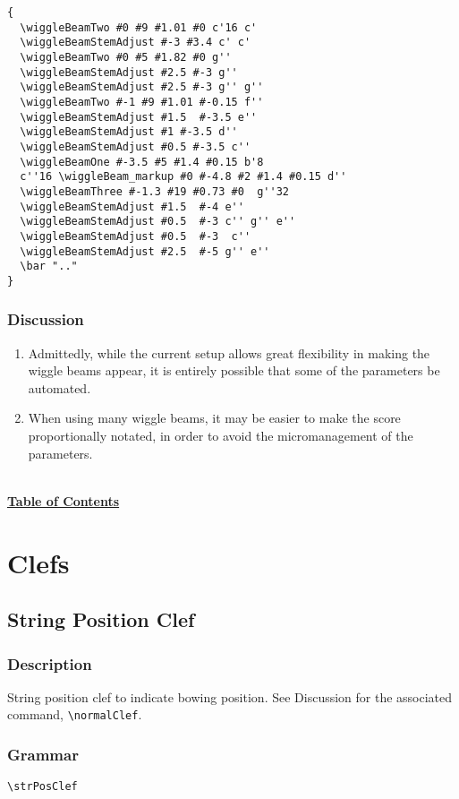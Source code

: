 \documentclass[11pt, oneside]{book}   	%
\begin{document}
\begin{verbatim}
{
  \wiggleBeamTwo #0 #9 #1.01 #0 c'16 c'
  \wiggleBeamStemAdjust #-3 #3.4 c' c'
  \wiggleBeamTwo #0 #5 #1.82 #0 g''
  \wiggleBeamStemAdjust #2.5 #-3 g''
  \wiggleBeamStemAdjust #2.5 #-3 g'' g''
  \wiggleBeamTwo #-1 #9 #1.01 #-0.15 f''
  \wiggleBeamStemAdjust #1.5  #-3.5 e''
  \wiggleBeamStemAdjust #1 #-3.5 d''
  \wiggleBeamStemAdjust #0.5 #-3.5 c''
  \wiggleBeamOne #-3.5 #5 #1.4 #0.15 b'8 
  c''16 \wiggleBeam_markup #0 #-4.8 #2 #1.4 #0.15 d''
  \wiggleBeamThree #-1.3 #19 #0.73 #0  g''32
  \wiggleBeamStemAdjust #1.5  #-4 e''
  \wiggleBeamStemAdjust #0.5  #-3 c'' g'' e''
  \wiggleBeamStemAdjust #0.5  #-3  c''
  \wiggleBeamStemAdjust #2.5  #-5 g'' e''
  \bar ".."
}
\end{verbatim}
\vfill \break

\subsection{Discussion}
\begin{enumerate}
\item Admittedly, while the current setup allows great flexibility in making the wiggle beams appear, it is entirely possible that some of the parameters be automated. 
\item When using many wiggle beams, it may be easier to make the score proportionally notated, in order to avoid the micromanagement of the parameters. 
\end{enumerate}
\hyperref[sec:toc]{\\ \textbf{Table of Contents}}



\chapter {Clefs}


\section {String Position Clef}
\hfill
{}
\hfill

\subsection{Description}
String position clef to indicate bowing position. See Discussion for the associated command, \verb|\normalClef|.

\subsection{Grammar}
\begin{verbatim}
\strPosClef 
\end{verbatim}
\end{document}
